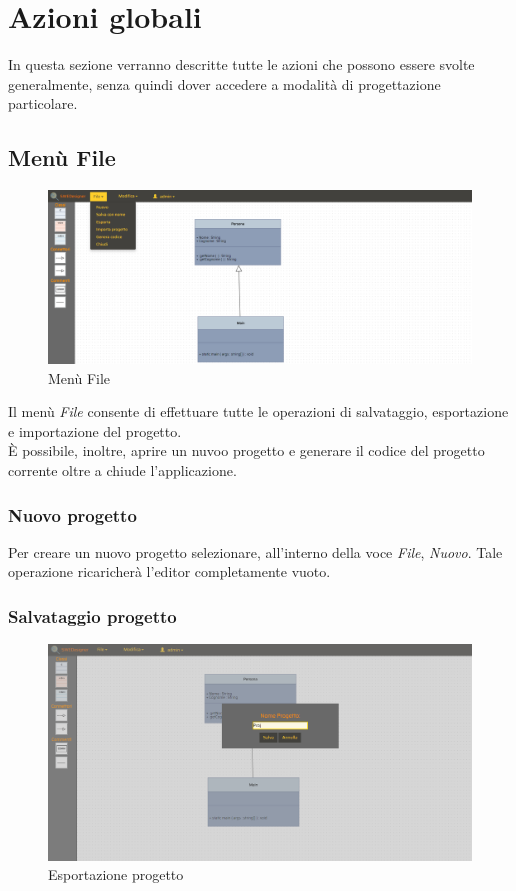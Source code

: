 \section{Azioni globali}
In questa sezione verranno descritte tutte le azioni che possono essere svolte generalmente, senza quindi dover accedere a modalità
di progettazione particolare.

	\subsection{Menù File}
		\begin{figure}[H]
			\centering
				\includegraphics[width=1\linewidth]{res/img/menuFile.png}
			\caption{Menù File}
		\end{figure}
		Il menù \emph{File} consente di effettuare tutte le operazioni di salvataggio, esportazione e importazione del progetto.\\
		È possibile, inoltre, aprire un nuvoo progetto e generare il codice del progetto corrente oltre a chiude l'applicazione.\\
		\subsubsection{Nuovo progetto}
			Per creare un nuovo progetto selezionare, all'interno della voce \emph{File}, \emph{Nuovo}.
			Tale operazione ricaricherà l'editor completamente vuoto.
		\subsubsection{Salvataggio progetto}

			\begin{figure}[H]
				\centering
					\includegraphics[width=1\linewidth]{res/img/salvaConNome.png}
				\caption{Esportazione progetto}
			\end{figure}


